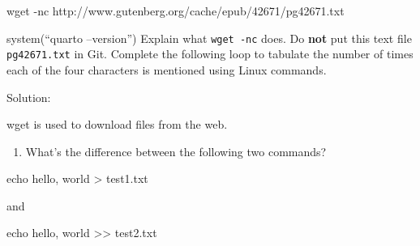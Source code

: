 \documentclass[
]{article}
\newenvironment{Shaded}{\begin{snugshade}}{\end{snugshade}}
\newcommand{\AttributeTok}[1]{\textcolor[rgb]{0.40,0.45,0.13}{#1}}
\newcommand{\BuiltInTok}[1]{\textcolor[rgb]{0.00,0.23,0.31}{#1}}
\newcommand{\ControlFlowTok}[1]{\textcolor[rgb]{0.00,0.23,0.31}{#1}}
\newcommand{\FunctionTok}[1]{\textcolor[rgb]{0.28,0.35,0.67}{#1}}
\newcommand{\KeywordTok}[1]{\textcolor[rgb]{0.00,0.23,0.31}{#1}}
\newcommand{\NormalTok}[1]{\textcolor[rgb]{0.00,0.23,0.31}{#1}}
\newcommand{\OperatorTok}[1]{\textcolor[rgb]{0.37,0.37,0.37}{#1}}
\newcommand{\StringTok}[1]{\textcolor[rgb]{0.13,0.47,0.30}{#1}}
\newcommand{\VariableTok}[1]{\textcolor[rgb]{0.07,0.07,0.07}{#1}}
\providecommand{\tightlist}{%
  \setlength{\itemsep}{0pt}\setlength{\parskip}{0pt}}\usepackage{longtable,booktabs,array}
\begin{document}
\begin{Shaded}
\begin{Highlighting}[]
\FunctionTok{wget} \AttributeTok{{-}nc}\NormalTok{ http://www.gutenberg.org/cache/epub/42671/pg42671.txt}
\end{Highlighting}
\end{Shaded}

system(``quarto --version'') Explain what \texttt{wget\ -nc} does. Do
\textbf{not} put this text file \texttt{pg42671.txt} in Git. Complete
the following loop to tabulate the number of times each of the four
characters is mentioned using Linux commands.

\begin{Shaded}
\end{Shaded}

Solution:

wget is used to download files from the web.

\begin{enumerate}
\def\labelenumi{\arabic{enumi}.}
\setcounter{enumi}{1}
\tightlist
\item
  What's the difference between the following two commands?
\end{enumerate}

\begin{Shaded}
\begin{Highlighting}[]
\BuiltInTok{echo} \StringTok{\textquotesingle{}hello, world\textquotesingle{}} \OperatorTok{\textgreater{}}\NormalTok{ test1.txt}
\end{Highlighting}
\end{Shaded}

and

\begin{Shaded}
\begin{Highlighting}[]
\BuiltInTok{echo} \StringTok{\textquotesingle{}hello, world\textquotesingle{}} \OperatorTok{\textgreater{}\textgreater{}}\NormalTok{ test2.txt}
\end{Highlighting}
\end{Shaded}
\end{document}
